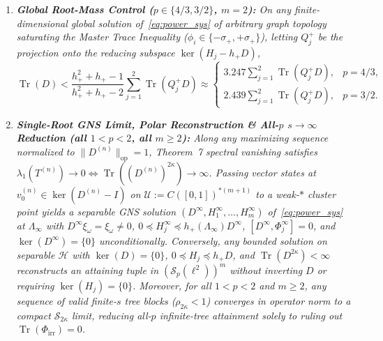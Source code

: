\documentclass[10pt,letterpaper]{article}
\newcommand{\Hilb}{\mathcal{H}}
\newcommand{\Sp}{\mathcal{S}_p}
\newcommand{\Tr}{\operatorname{Tr}}
\newcommand{\op}{\mathrm{op}}
\begin{document}
\begin{tcolorbox}[mathbox]
\begin{enumerate}[label=(\alph*),leftmargin=1.8em,itemsep=2pt,topsep=2pt]
\[    \qquad \bigl(\le 0.3208\text{ at }p=\tfrac{4}{3},\;\; \le 0.2201\text{ at }p=\tfrac{3}{2}\bigr),
  \]
  \emph{yielding unconditional Negative Trace Drift $\Tr(\Phi) < -\frac{\sigma_+}{2m}\Tr(D^{2\kappa}) < 0$ and passing in operator norm ($s \to \infty$) to an explicit infinite-rank tuple $(A_1,\dots,A_m) \in (\Sp(\ell^2))^m$ \textbf{unconditionally attaining} $C_{p,m}^{\mathrm{tree}}(\infty) := (\Lambda_{\mathrm{tree}}(\infty)/2^{2\kappa-1})^{1/(2\kappa)}$. In particular, \textbf{Open Piece~1 ($\Lambda_\infty = \Lambda_{\mathrm{tree}}(\infty)$) unconditionally implies Open Piece~2} at $p \in \{4/3, 3/2\}$ for every $m \ge 2$.}
  \item \emph{\textbf{Global Root-Mass Control ($p \in \{4/3, 3/2\}$, $m = 2$):} On any finite-dimensional global solution of~\eqref{eq:power_sys} of arbitrary graph topology saturating the Master Trace Inequality ($\phi_i \in \{-\sigma_+, +\sigma_+\}$), letting $Q_j^+$ be the projection onto the reducing subspace $\ker(H_j - h_+ D)$,}
  \[
    \Tr(D) < \frac{h_+^2 + h_+ - 1}{h_+^2 + h_+ - 2}\sum_{j=1}^2 \Tr(Q_j^+ D)
    \approx \begin{cases} 3.247 \sum_{j=1}^2 \Tr(Q_j^+ D), & p = 4/3, \\ 2.439 \sum_{j=1}^2 \Tr(Q_j^+ D), & p = 3/2. \end{cases}
  \]
  \item \emph{\textbf{Single-Root GNS Limit, Polar Reconstruction \& All-$p$ $s \to \infty$ Reduction (all $1 < p < 2$, all $m \ge 2$):} Along any maximizing sequence normalized to $\|D^{(n)}\|_{\op} = 1$, Theorem~7 spectral vanishing satisfies $\lambda_1(T^{(n)}) \to 0 \iff \Tr((D^{(n)})^{2\kappa}) \to \infty$. Passing vector states at $v_0^{(n)} \in \ker(D^{(n)} - I)$ on $\mathcal{U} := C([0,1])^{*(m+1)}$ to a weak-$*$ cluster point yields a separable GNS solution $(D^\infty, H_1^\infty, \dots, H_m^\infty)$ of~\eqref{eq:power_sys} at $\Lambda_\infty$ with $D^\infty \xi_\omega = \xi_\omega \neq 0$, $0 \preceq H_j^\infty \preceq h_+(\Lambda_\infty) D^\infty$, $[D^\infty, \Phi_j^\infty] = 0$, and $\ker(D^\infty) = \{0\}$ unconditionally. Conversely, any bounded solution on separable $\Hilb$ with $\ker(D) = \{0\}$, $0 \preceq H_j \preceq h_+ D$, and $\Tr(D^{2\kappa}) < \infty$ reconstructs an attaining tuple in $(\Sp(\ell^2))^m$ without inverting $D$ or requiring $\ker(H_j) = \{0\}$. Moreover, for all $1 < p < 2$ and $m \ge 2$, any sequence of valid finite-$s$ tree blocks ($\rho_{2\kappa} < 1$) converges in operator norm to a compact $\mathcal{S}_{2\kappa}$ limit, reducing all-$p$ infinite-tree attainment solely to ruling out $\Tr(\Phi_{\mathrm{irr}}) = 0$.}
\end{enumerate}
\end{tcolorbox}
\end{document}
